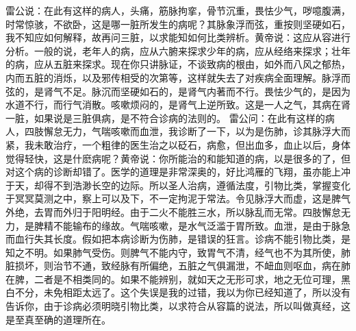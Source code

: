 \documentclass[a4paper,12pt,UTF8,twoside]{ctexbook}
\begin{document}
雷公说：在此有这样的病人，头痛，筋脉拘挛，骨节沉重，畏怯少气，哕噫腹满，时常惊骇，不欲卧，这是哪一脏所发生的病呢？其脉象浮而弦，重按则坚硬如石，我不知应如何解释，故再问三脏，以求能知如何比类辨析。黄帝说：这应从容进行分析。一般的说，老年人的病，应从六腑来探求少年的病，应从经络来探求；壮年的病，应从五脏来探求。现在你只讲脉证，不谈致病的根由，如外而八风之郁热，内而五脏的消烁，以及邪传相受的次第等，这样就失去了对疾病全面理解。脉浮而弦的，是肾气不足。脉沉而坚硬如石的，是肾气内著而不行。畏怯少气的，是因为水道不行，而行气消散。咳嗽烦闷的，是肾气上逆所致。这是一人之气，其病在肾一脏，如果说是三脏俱病，是不符合诊病的法则的。
雷公问：在此有这样的病人，四肢懈怠无力，气喘咳嗽而血泄，我诊断了一下，以为是伤肺，诊其脉浮大而紧，我未敢治疗，一个粗律的医生治之以砭石，病愈，但出血多，血止以后，身体觉得轻快，这是什麽病呢？黄帝说：你所能治的和能知道的病，以是很多的了，但对这个病的诊断却错了。医学的道理是非常深奥的，好比鸿雁的飞翔，虽亦能上冲于天，却得不到浩渺长空的边际。所以圣人治病，遵循法度，引物比类，掌握变化于冥冥莫测之中，察上可以及下，不一定拘泥于常法。令见脉浮大而虚，这是脾气外绝，去胃而外归于阳明经。由于二火不能胜三水，所以脉乱而无常。四肢懈怠无力，是脾精不能输布的缘故。气喘咳嗽，是水气泛滥于胃所致。血泄，是由于脉急而血行失其长度。假如把本病诊断为伤肺，是错误的狂言。诊病不能引物比类，是知之不明。如果肺气受伤。则脾气不能内守，致胃气不清，经气也不为其所使，肺脏损坏，则治节不通，致经脉有所偏绝，五脏之气俱漏泄，不衄血则呕血，病在肺在脾，二者是不相类同的。如果不能辨别，就如天之无形可求，地之无位可理，黑白不分，未免相距太远了。这个失误是我的过错，我以为你已经知道了，所以没有告诉你，由于诊病必须明晓引物比类，以求符合从容篇的说法，所以叫做真经，这是至真至确的道理所在。
\end{document}
